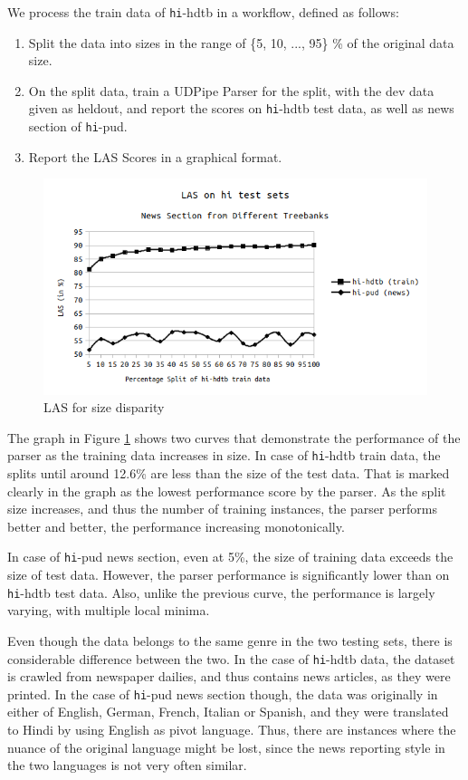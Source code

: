 We process the train data of \verb|hi|-hdtb in a workflow, defined as follows:
\begin{enumerate}
    \item Split the data into sizes in the range of \{5, 10, ..., 95\} \% of the original data size.
    \item On the split data, train a UDPipe Parser for the split, with the dev data given as heldout, and report the scores on \verb|hi|-hdtb test data, as well as news section of \verb|hi|-pud.
    \item Report the LAS Scores in a graphical format.
\end{enumerate}

\begin{figure}[H]
    \centering
    \includegraphics[scale=0.90]{img/size-theta1-1}
    \caption{LAS for size disparity}
    \label{fig:size-theta1-1}
\end{figure}

The graph in Figure \ref{fig:size-theta1-1} shows two curves that demonstrate the performance of the parser as the training data increases in size. In case of \verb|hi|-hdtb train data, the splits until around 12.6\% are less than the size of the test data. That is marked clearly in the graph as the lowest performance score by the parser. As the split size increases, and thus the number of training instances, the parser performs better and better, the performance increasing monotonically.

In case of \verb|hi|-pud news section, even at 5\%, the size of training data exceeds the size of test data. However, the parser performance is significantly lower than on \verb|hi|-hdtb test data. Also, unlike the previous curve, the performance is largely varying, with multiple local minima.

Even though the data belongs to the same genre in the two testing sets, there is considerable difference between the two. In the case of \verb|hi|-hdtb data, the dataset is crawled from newspaper dailies, and thus contains news articles, as they were printed. In the case of \verb|hi|-pud news section though, the data was originally in either of English, German, French, Italian or Spanish, and they were translated to Hindi by using English as pivot language. Thus, there are instances where the nuance of the original language might be lost, since the news reporting style in the two languages is not very often similar.

